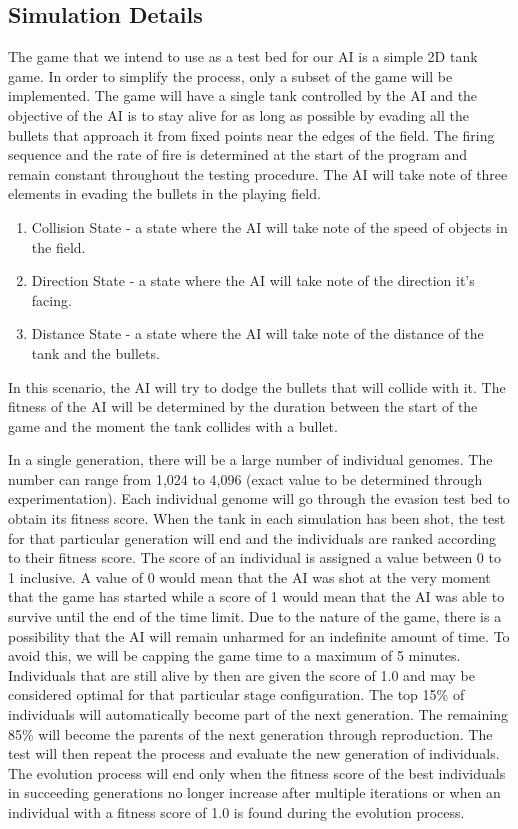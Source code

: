 \subsection{Simulation Details}
The game that we intend to use as a test bed for our AI is a simple 2D tank game.
In order to simplify the process, only a subset of the game will be implemented.
The game will have a single tank controlled by the AI and the objective of the AI
is to stay alive for as long as possible by evading all the bullets that approach
it from fixed points near the edges of the field. The firing sequence and the rate
of fire is determined at the start of the program and remain constant throughout
the testing procedure. The AI will take note of three elements in evading the
bullets in the playing field.

\begin{enumerate}
 \item Collision State - a state where the AI will take note of the speed 
of objects in the field.
 \item Direction State - a state where the AI will take note 
of the direction it's facing.
 \item Distance State - a state where the AI will
take note of the distance of the tank and the bullets.
\end{enumerate}

In this scenario, the AI will try to dodge the bullets that will collide with
it. The fitness of the AI will be determined by the duration between the start of
the game and the moment the tank collides with a bullet.


In a single generation, there will be a large number of individual genomes. The number
can range from 1,024 to 4,096 (exact value to be determined through experimentation).
Each individual genome will go through the evasion test bed to obtain its fitness score.
When the tank in each simulation has been
shot, the test for that particular generation will end and the individuals are ranked
according to their fitness score. The score of an individual is assigned a value
between 0 to 1 inclusive. A value of 0 would mean that the AI was shot at the
very moment that the game has started while a score of 1 would mean that the AI
was able to survive until the end of the time limit.
Due to the nature of the game, there is a possibility
that the AI will remain unharmed for an indefinite amount of time. To avoid this,
we will be capping the game time to a maximum of 5 minutes. Individuals that are
still alive by then are given the score of 1.0 and may be considered optimal for
that particular stage configuration.
The top 15\% of individuals will automatically become
part of the next generation. The remaining 85\% will become the parents of the next generation 
through reproduction. The test will then repeat the process and evaluate the new
generation of individuals. The evolution process will end only when the fitness score
of the best individuals in succeeding generations no longer increase after multiple iterations
or when an individual with a fitness score of 1.0 is found during the evolution
process.


